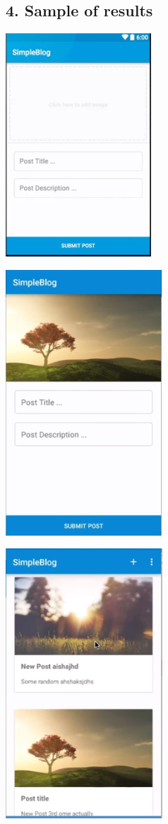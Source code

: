 \documentclass[12pt]{article}
\begin{document}
\subsection*{4. Sample of results}
\begin{center}
\includegraphics{sample2.png}
\end{center}
\begin{center}
\includegraphics{sample3.png}
\end{center}
\begin{center}
\includegraphics{sample4.png}
\end{center}
\end{document}
